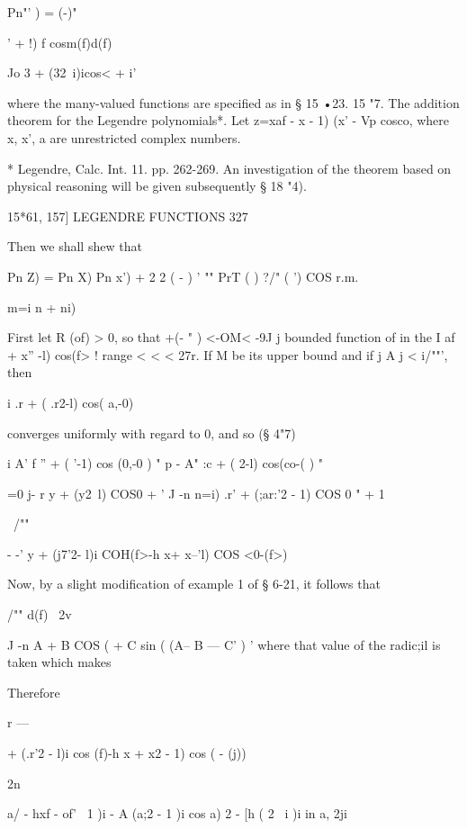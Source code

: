 {{{Pn"'  ) = (-)" 



' + !) f  cosm(f)d(f) 

Jo  3 + (32\ i)icos<    + i' 



where the many-valued functions are specified as in § 15 •23. 
15 "7. The addition theorem for the Legendre polynomials*. 
Let z=xaf - x  - 1)  (x' - Vp cosco, where x, x', a are unrestricted complex numbers. 

* Legendre, Calc. Int. 11. pp. 262-269. An investigation of the theorem based on physical 
reasoning will be given subsequently  § 18 "4). 



15*61, 157] LEGENDRE FUNCTIONS 327 

Then we shall shew that 

Pn  Z) = Pn  X) Pn  x') + 2 2 ( - ) '  ""  PrT ( ) ?/" ( ') COS r.m. 

m=i  n + ni) \ 

First let R (of) > 0, so that  +(-  " ) <-OM< -9J j   bounded function of in the 
I af +  x'' -l) cos(f> ! 
range < <  < 27r. If M be its upper bound and if j A j < i/""', then 

i    .r + ( .r2-l) cos( a,-0)   

converges uniformly with regard to 0, and so (§ 4"7) 

i A'  f ''    + (  '-1)  cos (0,-0 ) "   p - A" :c + ( 2-l) cos(co-( ) " 

 =0 j- r  y + (y2\ l) COS0   + ' J -n n=i)  .r' + (;ar:'2 - 1)  COS 0 " + 1 

\  /""     

-  -'  y + (j7'2- l)i COH(f>-h  x+ x--'l) COS <0-(f>)  

Now, by a slight modification of example 1 of § 6-21, it follows that 

/"" d(f) \  2v 

J -n A + B COS (   + C sin (  (A-- B  — C' ) ' 
where that value of the radic;il is taken which makes 

Therefore 



r — 



+ (.r'2 - l)i cos (f)-h  x +  x2 - 1)  cos (  - (j))  

2n 



  a/ - hxf -   of' \  1 )i - A (a;2 - 1 )i cos a) 2 - [h ( 2 \  i )i  in a, 2ji 

}}}
